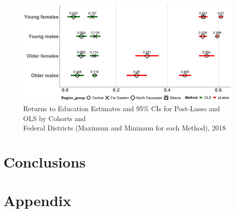 \documentclass[alpha-refs]{wiley-article-04t}
\begin{document}
\begin{figure}[H]
	\includegraphics[width=\textwidth]{iv_by_districts.png}
	\caption{Returns to Education Estimates and 95\% CIs for Post-Lasso and OLS by Cohorts and\\
    Federal Districts (Maximum and Minimum for each Method), 2018} \label{fig:5.5}
\end{figure}

\newpage

\section{Conclusions}

\lipsum[1]



\printbibliography

\newpage
\section*{Appendix}




\newpage
\printbibliography
\end{document}
